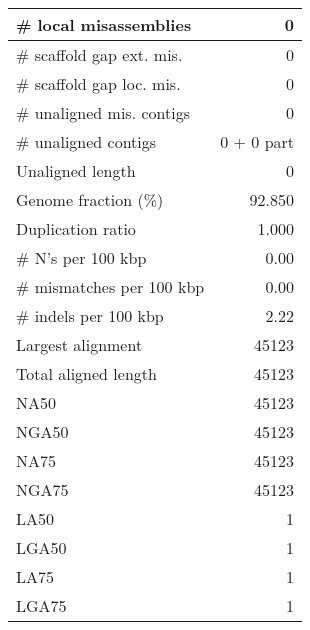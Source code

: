 \documentclass[12pt,a4paper]{article}
\begin{document}
\begin{table}[ht]
\begin{center}
\begin{tabular}{|l*{1}{|r}|}
\# local misassemblies & 0 \\ \hline
\# scaffold gap ext. mis. & 0 \\ \hline
\# scaffold gap loc. mis. & 0 \\ \hline
\# unaligned mis. contigs & 0 \\ \hline
\# unaligned contigs & 0 + 0 part \\ \hline
Unaligned length & 0 \\ \hline
Genome fraction (\%) & 92.850 \\ \hline
Duplication ratio & 1.000 \\ \hline
\# N's per 100 kbp & 0.00 \\ \hline
\# mismatches per 100 kbp & 0.00 \\ \hline
\# indels per 100 kbp & 2.22 \\ \hline
Largest alignment & 45123 \\ \hline
Total aligned length & 45123 \\ \hline
NA50 & 45123 \\ \hline
NGA50 & 45123 \\ \hline
NA75 & 45123 \\ \hline
NGA75 & 45123 \\ \hline
LA50 & 1 \\ \hline
LGA50 & 1 \\ \hline
LA75 & 1 \\ \hline
LGA75 & 1 \\ \hline
\end{tabular}
\end{center}
\end{table}
\end{document}
